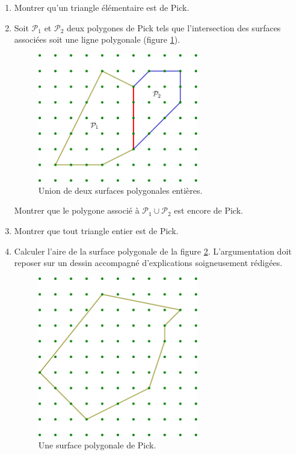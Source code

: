 \begin{enumerate}
 \item Montrer qu'un triangle élémentaire est de Pick.
 \item Soit $\mathcal{P}_1$ et $\mathcal{P}_2$ deux polygones de Pick tels que l'intersection des surfaces associées soit une ligne polygonale (figure \ref{fig:Epick_2}).
\begin{figure}[!ht]
 \centering
 \includegraphics[width=7cm]{./Epick_2.pdf}
 \caption{Union de deux surfaces polygonales entières.}
 \label{fig:Epick_2}
\end{figure}
 Montrer que le polygone associé à $\mathcal{P}_1 \cup \mathcal{P}_2$ est encore de Pick.
 \item Montrer que tout triangle entier est de Pick.
 \item Calculer l'aire de la surface polygonale de la figure \ref{fig:Epick_3}. L'argumentation doit reposer sur un dessin accompagné d'explications soigneusement rédigées.
\begin{figure}[!ht]
 \centering
 \includegraphics[width=7cm]{./Epick_3.pdf}
 \caption{Une surface polygonale de Pick.}
 \label{fig:Epick_3}
\end{figure}
\end{enumerate}
